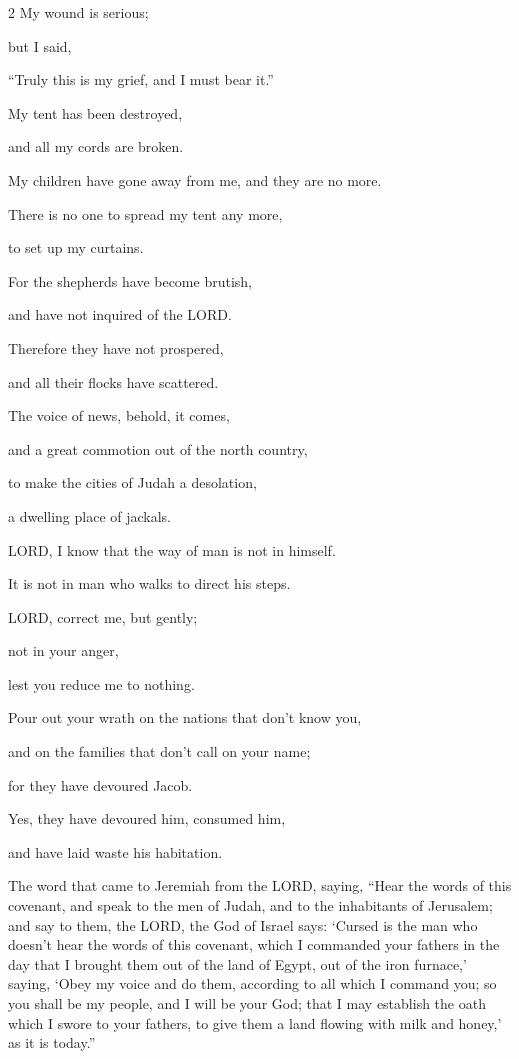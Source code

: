 \begin{multicols}{2}
	My wound is serious;
	
	but I said,
	
	“Truly this is my grief, and I must bear it.”
	
	
	\myverse{}My tent has been destroyed,
	
	and all my cords are broken.
	
	My children have gone away from me, and they are no more.
	
	There is no one to spread my tent any more,
	
	to set up my curtains.
	
	
	\myverse{}For the shepherds have become brutish,
	
	and have not inquired of the LORD.
	
	Therefore they have not prospered,
	
	and all their flocks have scattered.
	
	
	\myverse{}The voice of news, behold, it comes,
	
	and a great commotion out of the north country,
	
	to make the cities of Judah a desolation,
	
	a dwelling place of jackals.
	
	
	\myverse{}LORD, I know that the way of man is not in himself.
	
	It is not in man who walks to direct his steps.
	
	
	\myverse{}LORD, correct me, but gently;
	
	not in your anger,
	
	lest you reduce me to nothing.
	
	
	\myverse{}Pour out your wrath on the nations that don’t know you,
	
	and on the families that don’t call on your name;
	
	for they have devoured Jacob.
	
	Yes, they have devoured him, consumed him,
	
	and have laid waste his habitation.
	
\end{multicols}

\mychapter{}\myverse*{}The word that came to Jeremiah from the LORD, saying, \myverse{}“Hear the words of this covenant, and speak to the men of Judah, and to the inhabitants of Jerusalem; \myverse{}and say to them, the LORD, the God of Israel says: ‘Cursed is the man who doesn’t hear the words of this covenant, \myverse{}which I commanded your fathers in the day that I brought them out of the land of Egypt, out of the iron furnace,’ saying, ‘Obey my voice and do them, according to all which I command you; so you shall be my people, and I will be your God; \myverse{}that I may establish the oath which I swore to your fathers, to give them a land flowing with milk and honey,’ as it is today.”

